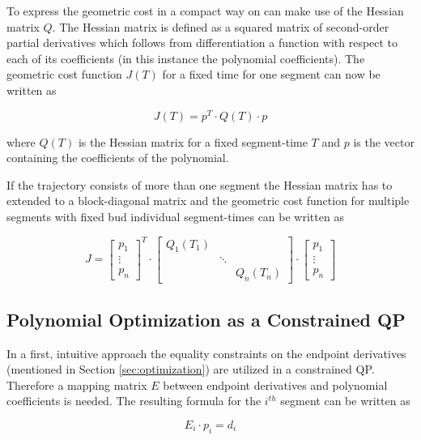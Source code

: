 To express the geometric cost in a compact way on can make use of the Hessian matrix $Q$. The Hessian matrix is defined as a squared matrix of second-order partial derivatives which follows from differentiation a function with respect to each of its coefficients (in this instance the polynomial coefficients). The geometric cost function $J(T)$ for a fixed time for one segment can now be written as

\begin{equation}
J(T)  = p^T \cdot Q(T) \cdot p
\end{equation}

where $Q(T)$ is the Hessian matrix for a fixed segment-time $T$ and $p$ is the vector containing the coefficients of the polynomial. \newline

If the trajectory consists of more than one segment the Hessian matrix has to extended to a block-diagonal matrix and the geometric cost function for multiple segments with fixed bud individual segment-times can be written as

\begin{equation}
J =
\begin{bmatrix}
   p_1 \\
\vdots \\
  p_n
\end{bmatrix}^T
\cdot
\begin{bmatrix}
   Q_1(T_1) &  &  \\
    & \ddots &  \\
   & & Q_n(T_n)
\end{bmatrix} 
\cdot
\begin{bmatrix}
   p_1 \\
\vdots \\
  p_n
\end{bmatrix}
\end{equation}


\subsection{Polynomial Optimization as a Constrained QP}

In a first, intuitive approach the equality constraints on the endpoint derivatives (mentioned in Section \ref{sec:optimization}) are utilized in a constrained QP. Therefore a mapping matrix $E$ between endpoint derivatives and polynomial coefficients is needed. The resulting formula for the $i^{th}$ segment can be written as

\begin{equation}
E_i \cdot p_i = d_i
\label{equ:mapping}
\end{equation}

